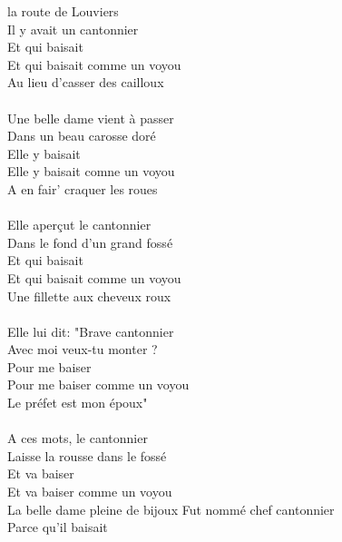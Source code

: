 
 la route de Louviers \bissimple 
\\Il y avait un cantonnier\bissimple 
\\Et qui baisait \bissimple 
\\Et qui baisait comme un voyou  
\\Au lieu d'casser des cailloux  
\\\\Une belle dame vient à passer \bissimple 
\\Dans un beau carosse doré \bissimple 
\\Elle y baisait \bissimple 
\\Elle y baisait comne un voyou  
\\A en fair' craquer les roues  
\\\\Elle aperçut le cantonnier \bissimple 
\\Dans le fond d'un grand fossé \bissimple 
\\Et qui baisait \bissimple 
\\Et qui baisait comme un voyou  
\\Une fillette aux cheveux roux  
\\\\Elle lui dit: "Brave cantonnier \bissimple 
\\Avec moi veux-tu monter ? \bissimple 
\\Pour me baiser \bissimple 
\\Pour me baiser comme un voyou
\\Le préfet est mon époux"  
\\\\A ces mots, le cantonnier \bissimple 
\\Laisse la rousse dans le fossé \bissimple 
\\Et va baiser \bissimple 
\\Et va baiser comme un voyou  
\\La belle dame pleine de bijoux  
{Fut nommé chef cantonnier}
\\Parce qu'il baisait \bissimple 
